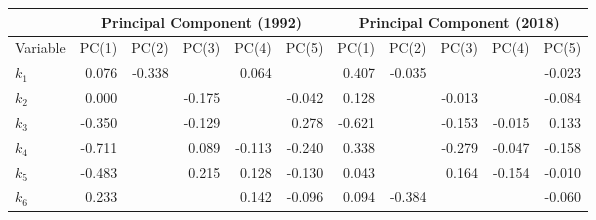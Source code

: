 \begin{table}[htb]
	\centering
	\fontsize{8.5}{10.2} \selectfont
	\begin{tabular}{ lrrrrr|rrrrr }
		\toprule
		\multicolumn{1}{c}{}  & \multicolumn{5}{c|}{Principal Component (1992)} & \multicolumn{5}{c}{Principal Component (2018)}                                                                                                                                                                                 \\
		\midrule
		Variable & PC(1)                                             & PC(2)                                            & PC(3)               & PC(4)               & PC(5)               & PC(1)               & PC(2)               & PC(3)               & PC(4)               & PC(5)               \\
		\midrule
		$k_{1}$  & 0.076                                             & -0.338                                           & \color{red}{-0.644} & 0.064               & \color{red}{-0.419} & 0.407               & -0.035              & \color{red}{-0.648} & \color{red}{-0.476} & -0.023              \\
		$k_{2}$  & 0.000                                             & \color{red}{-0.588}                              & -0.175              & \color{red}{-0.713} & -0.042              & 0.128               & \color{red}{-0.613} & -0.013              & \color{red}{-0.614} & -0.084              \\
		$k_{3}$  & -0.350                                            & \color{red}{0.642}                               & -0.129              & \color{red}{-0.522} & 0.278               & -0.621              & \color{red}{0.600}  & -0.153              & -0.015              & 0.133               \\
		$k_{4}$  & -0.711                                            & \color{red}{0.557}                               & 0.089               & -0.113              & -0.240              & 0.338               & \color{red}{0.843}  & -0.279              & -0.047              & -0.158              \\
		$k_{5}$  & -0.483                                            & \color{red}{0.636}                               & 0.215               & 0.128               & -0.130              & 0.043               & \color{red}{0.893}  & 0.164               & -0.154              & -0.010              \\
		$k_{6}$  & 0.233                                             & \color{red}{0.487}                               & \color{red}{-0.708} & 0.142               & -0.096              & 0.094               & -0.384              & \color{red}{-0.671} & \color{red}{0.528}  & -0.060              \\

\end{tabular}
\end{table}
